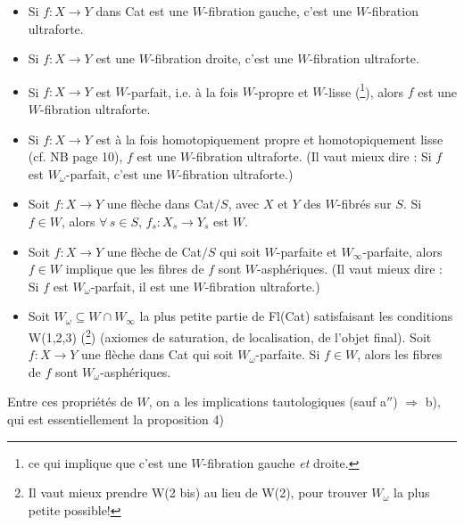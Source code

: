 \documentclass[11pt]{article}
\newcommand{\printedpage}[1]{\marginpar{\footnotesize p.~#1}}
\newcommand{\msp}[1]{\marginpar{\footnotesize [#1]}}
\begin{document}
\begin{itemize}[leftmargin=4em, labelwidth=2.5em, labelsep=0.6em, align=right]
\item[a$_1$)] Si $f : X \longrightarrow Y$ dans Cat est une $W$-fibration gauche, c'est une $W$-fibration ultraforte.

\item[a$_2$)] Si $f : X \longrightarrow Y$ est une $W$-fibration droite, c'est une $W$-fibration ultraforte.

\item[a$'$)] Si $f : X \longrightarrow Y$ est $W$-parfait, i.e. à la fois $W$-propre et $W$-lisse (\footnote[31]{ce qui implique que c'est une $W$-fibration gauche \textit{et} droite.}), alors $f$ est une $W$-fibration ultraforte.

\item[a$''$)] Si $f : X \longrightarrow Y$ est à la fois homotopiquement propre et homotopiquement lisse (cf. NB page 10), $f$ est une $W$-fibration ultraforte. (Il vaut mieux dire : Si $f$ est $W_\omega$-parfait, c'est une $W$-fibration ultraforte.)

\item[b)] Soit $f : X \longrightarrow Y$ une flèche dans Cat$/S$, avec $X$ et $Y$ des $W$-fibrés sur $S$. Si $f \in W$, alors $\forall\, s \in S$, $f_s : X_s \longrightarrow Y_s$ est $W$.

\item[b$'$)] Soit $f : X \longrightarrow Y$ une flèche de Cat$/S$ qui soit $W$-parfaite et $W_\infty$-parfaite, alors $f \in W$ implique que les fibres de $f$ sont $W$-asphériques. (Il vaut mieux dire : Si $f$ est $W_\omega$-parfait, il est une $W$-fibration ultraforte.)

\item[b$''$)] \msp{page 14}Soit $W_\omega \subseteq W \cap W_\infty$ la plus petite partie de Fl(Cat) satisfaisant les conditions W(1,2,3) (\footnote[32]{Il vaut mieux prendre W(2 bis) au lieu de W(2), pour trouver $W_\omega$ la plus petite possible!}) (axiomes de saturation, de localisation, de l'objet final). Soit $f : X \longrightarrow Y$ une flèche dans Cat qui soit $W_\omega$-parfaite. Si $f \in W$, alors les fibres de $f$ sont $W_\omega$-asphériques.
\end{itemize}

Entre ces propriétés de $W$, on a les implications tautologiques (sauf a$''$) $\Longrightarrow$ b), qui est essentiellement la proposition 4)

\printedpage{12}
\end{document}

